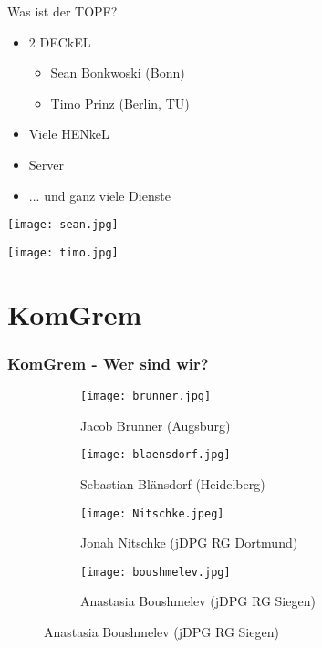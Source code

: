\documentclass[compress, aspectratio=169]{beamer}
\begin{document}
\begin{frame}{Was ist der TOPF?}
  \begin{minipage}{.5\textwidth}
    \begin{itemize}
      \item 2 DECkEL \footnotemark[1]
      \begin{itemize}
        \item Sean Bonkwoski (Bonn)
        \item Timo Prinz (Berlin, TU)
      \end{itemize}
      \item Viele HENkeL\footnotemark[2]\footnotemark[3]
      \item Server
      \item ... und ganz viele Dienste
    \end{itemize}
  \end{minipage}
  \hfill
  \begin{minipage}{.48\textwidth}
    \begin{minipage}[c]{.5\textwidth}
      \texttt{[image: sean.jpg]}
    \end{minipage}
    \begin{minipage}[c]{.48\textwidth}
      \texttt{[image: timo.jpg]}
    \end{minipage}
  \end{minipage}
\end{frame}

\section{KomGrem}

\begin{frame}\frametitle{KomGrem - Wer sind wir?}
 \begin{figure}
		\begin{subfigure}[t]{0.24\textwidth}
			\texttt{[image: brunner.jpg]}
			\caption*{Jacob Brunner (Augsburg)}
		\end{subfigure}
			\begin{subfigure}[t]{0.24\textwidth}
				\texttt{[image: blaensdorf.jpg]}
				\caption*{Sebastian Blänsdorf (Heidelberg)}
		\end{subfigure}
			\begin{subfigure}[t]{0.24\textwidth}
				\texttt{[image: Nitschke.jpeg]}
				\caption*{Jonah Nitschke (jDPG RG Dortmund)}
		\end{subfigure}
				\begin{subfigure}[t]{0.24\textwidth}
				\texttt{[image: boushmelev.jpg]}
				\caption*{Anastasia Boushmelev (jDPG RG Siegen)}
		\end{subfigure}
 \end{figure}
\end{frame}
\end{document}
